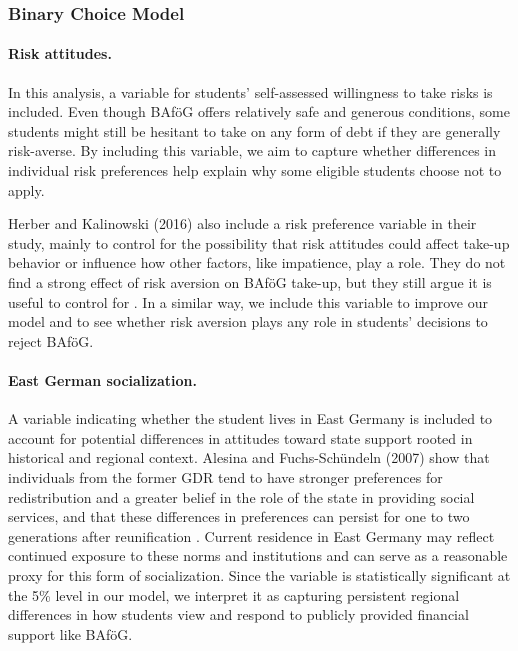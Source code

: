 \subsubsection{Binary Choice Model}







\paragraph{Risk attitudes.} In this analysis, a variable for students' self-assessed willingness to take risks is included. Even though BAföG offers relatively safe and generous conditions, some students might still be hesitant to take on any form of debt if they are generally risk-averse. By including this variable, we aim to capture whether differences in individual risk preferences help explain why some eligible students choose not to apply.

Herber and Kalinowski (2016) also include a risk preference variable in their study, mainly to control for the possibility that risk attitudes could affect take-up behavior or influence how other factors, like impatience, play a role. They do not find a strong effect of risk aversion on BAföG take-up, but they still argue it is useful to control for \citep{herber_non-take-up_2019}. In a similar way, we include this variable to improve our model and to see whether risk aversion plays any role in students’ decisions to reject BAföG.

\paragraph{East German socialization.}  A variable indicating whether the student lives in East Germany is included to account for potential differences in attitudes toward state support rooted in historical and regional context. Alesina and Fuchs-Schündeln (2007) show that individuals from the former GDR tend to have stronger preferences for redistribution and a greater belief in the role of the state in providing social services, and that these differences in preferences can persist for one to two generations after reunification \citep{alesina_good-bye_2007}. Current residence in East Germany may reflect continued exposure to these norms and institutions and can serve as a reasonable proxy for this form of socialization. Since the variable is statistically significant at the 5\% level in our model, we interpret it as capturing persistent regional differences in how students view and respond to publicly provided financial support like BAföG.


